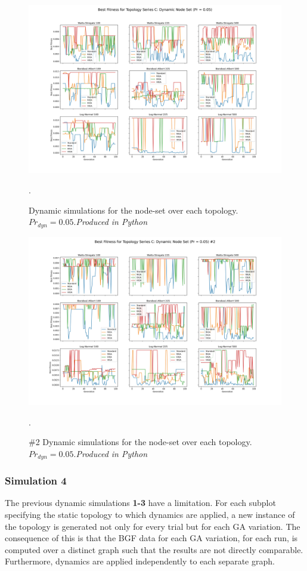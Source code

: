 \documentclass[
	a4paper, %
	10pt, %
	unnumberedsections, %
	twoside, %
]{LTJournalArticle}
\begin{document}
 \begin{figure}
	\includegraphics[width=\linewidth]{Figures/sims/dynamic/series_c_node.jpg}
	\caption{Dynamic simulations for the node-set over each topology. \(Pr_{dyn} = 0.05\).\emph{Produced in Python}}. 
	\label{fig:dynamic_5}
\end{figure}

\begin{figure}
	\includegraphics[width=\linewidth]{Figures/sims/dynamic/series_c_node_2.jpg}
	\caption{\#2 Dynamic simulations for the node-set over each topology. \(Pr_{dyn} = 0.05\).\emph{Produced in Python}}. 
	\label{fig:dynamic_6}
\end{figure}

\subsubsection{Simulation 4} The previous dynamic simulations \textbf{1-3} have a limitation. For each subplot specifying the static topology to which dynamics are applied, a new instance of the topology is generated not only for every trial but for each GA variation. The consequence of this is that the BGF data for each GA variation, for each run, is computed over a distinct graph such that the results are not directly comparable. Furthermore, dynamics are applied independently to each separate graph. \\
\end{document}
